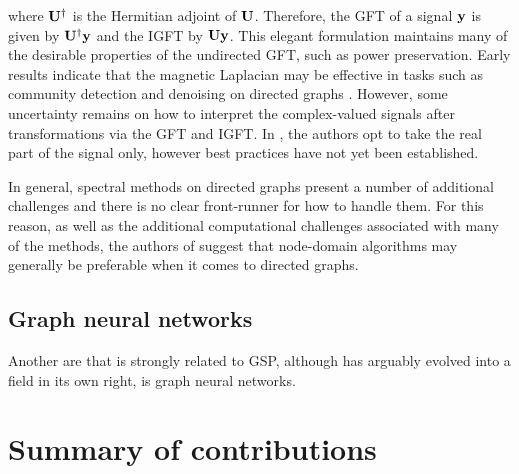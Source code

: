 where $\mathbf{U}^\dagger$ is the Hermitian adjoint of $\mathbf{U}$. Therefore, the GFT of a signal $\mathbf{y}$ is given by $\mathbf{U}^\dagger \mathbf{y}$ and the IGFT by $\mathbf{U}\mathbf{y}$. This elegant formulation maintains many of the desirable properties of the undirected GFT, such as power preservation. Early results indicate that the magnetic Laplacian may be effective in tasks such as community detection and denoising on directed graphs \citep{Furutani2020,Fanuel2017}. However, some uncertainty remains on how to interpret the complex-valued signals after transformations via the GFT and IGFT. In \cite{Furutani2020}, the authors opt to take the real part of the signal only, however best practices have not yet been established. 

In general, spectral methods on directed graphs present a number of additional challenges and there is no clear front-runner for how to handle them. For this reason, as well as the additional computational challenges associated with many of the methods, the authors of \cite{Marques2020} suggest that node-domain algorithms may generally be preferable when it comes to directed graphs. 


\subsection{Graph neural networks}

Another are that is strongly related to GSP, although has arguably evolved into a field in its own right, is graph neural networks. 




\section{Summary of contributions}

